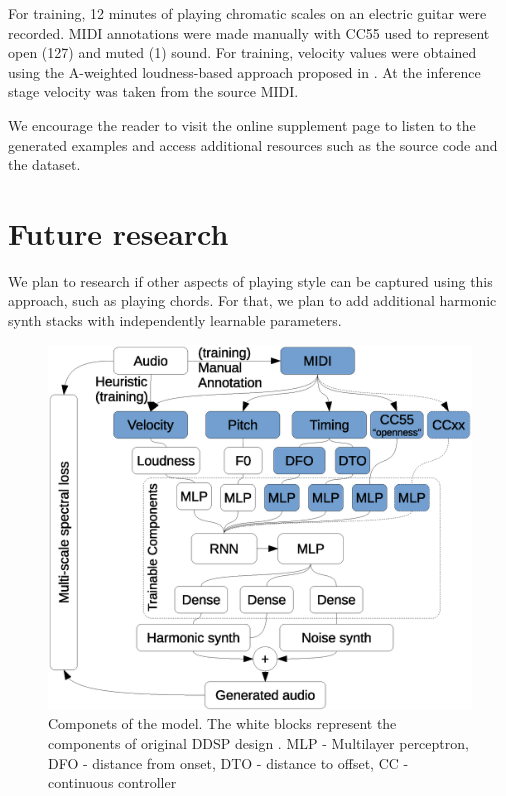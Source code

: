 \documentclass{article}
\begin{document}
\begin{sloppy}
For training, 12 minutes of playing chromatic scales on an electric guitar  were recorded. MIDI annotations were made manually with CC55 used to represent open (127) and muted (1) sound. For training, velocity values were obtained using the A-weighted loudness-based approach proposed in \cite{control-synthesis}. At the inference stage velocity was taken from the source MIDI.

We encourage the reader to visit the online supplement page \cite{online_supplement} to listen to the generated examples and access additional resources such as the source code and the dataset.

\section{Future research}
\label{sec:future_research}


We plan to research if other aspects of playing style can be captured using this approach, such as playing chords. For that, we plan to add additional harmonic synth stacks with independently learnable parameters.

\begin{figure}[t]
  \centering
  \centerline{\includegraphics[scale=0.4]{components}}
  \caption{Componets of the model. The white blocks represent the components of original DDSP design \cite{ddsp}. 
MLP - Multilayer perceptron, 
DFO - distance from onset, 
DTO - distance to offset,
CC - continuous controller
}
  \label{fig:components}
\end{figure}


\end{sloppy}
\end{document}
